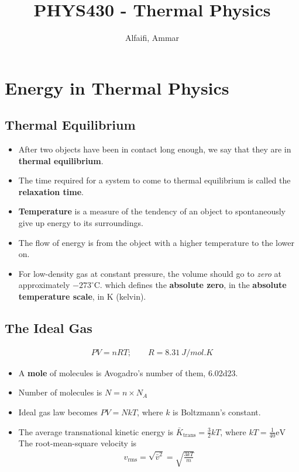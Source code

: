 \documentclass{book}
\title{PHYS430 - Thermal Physics}
\author{Alfaifi, Ammar}
\date{}
\begin{document}
\maketitle

\chapter{Energy in Thermal Physics}


\section{Thermal Equilibrium}%
\label{sec:thermal-equilibrium}

\begin{itemize}
	\item After two objects have been in contact long enough, we say that they are in \textbf{thermal equilibrium}.
	\item The time required for a system to come to thermal equilibrium is called the \textbf{relaxation time}.
	\item \textbf{Temperature} is a measure of the tendency of an object to spontaneously give up energy to its
	      surroundings.
	\item The flow of energy is from the object with a higher temperature to the lower on.
	\item For low-density gas at constant pressure, the volume should go to \textit{zero} at
	      approximately $-273^{\circ}$C. which defines the \textbf{absolute zero}, in the
	      \textbf{absolute temperature scale}, in K (kelvin).
\end{itemize}

\section{The Ideal Gas}%
\label{sec:The Ideal Gas}
\begin{align}
	\label{eq:ideal gas law}
	PV = nRT; \qquad R = \qty{8.31}{J / mol . K}
\end{align}

\begin{itemize}
	\item A \textbf{mole} of molecules is Avogadro's number of them, \num{6.02d23}.
	\item Number of molecules is $N=n \times N_{A}$
	\item Ideal gas law becomes $PV = NkT$, where $k$ is Boltzmann's constant.
	\item The average transnational kinetic energy is $\bar{K}_{\text{trans}}= \frac{3}{2}kT$,
	      where $kT = \frac{1}{40} \si{\electronvolt}$
	      The root-mean-square velocity is
	      \begin{align}
		      v_\text{rms} = \sqrt{\bar{v}^2} = \sqrt{\frac{3kT}{m}}
	      \end{align}

\end{itemize}
\end{document}
